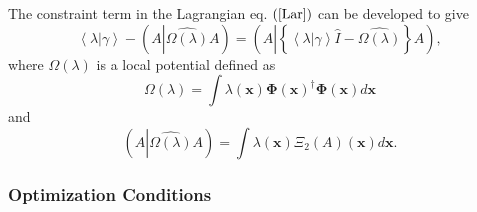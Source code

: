 \documentclass[aps,preprint]{revtex4}%
\begin{document}
The constraint term in the Lagrangian eq. $\left(  \ref{Lar}\right)  $ can be
developed to give
\begin{equation}
\left\langle \lambda\left\vert \gamma\right.  \right\rangle -\left(
A\left\vert \widehat{\Omega\left(  \lambda\right)  }\right.  A\right)
=\left(  A\left\vert \left\{  \left\langle \lambda\left\vert \gamma\right.
\right\rangle \hat{I}-\widehat{\Omega\left(  \lambda\right)  }\right\}
\right.  A\right)  ,
\end{equation}
where $\Omega\left(  \lambda\right)  $ is a local potential defined as
\begin{equation}
\Omega\left(  \lambda\right)  =\int\lambda\left(  \mathbf{x}\right)
\mathbf{\Phi}\left(  \mathbf{x}\right)  ^{\dagger}\mathbf{\Phi}\left(
\mathbf{x}\right)  d\mathbf{x}%
\end{equation}
and
\begin{equation}
\left(  A\left\vert \widehat{\Omega\left(  \lambda\right)  }\right.  A\right)
=\int\lambda\left(  \mathbf{x}\right)  \Xi_{2}\left(  A\right)  \left(
\mathbf{x}\right)  d\mathbf{x.}%
\end{equation}


\subsubsection{Optimization Conditions}
\end{document}
